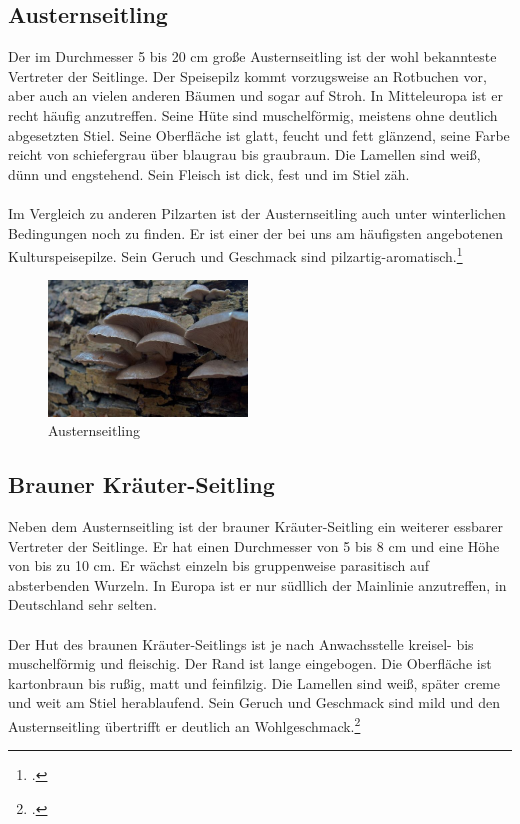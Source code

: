 \documentclass[a4paper,abstracton]{scrreprt}
\begin{document}
\subsection{Austernseitling}
Der im Durchmesser 5 bis 20 cm große Austernseitling ist der wohl bekannteste Vertreter der Seitlinge. Der Speisepilz kommt vorzugsweise an Rotbuchen vor, aber auch an vielen anderen Bäumen und sogar auf Stroh. In Mitteleuropa ist er recht häufig anzutreffen. Seine Hüte sind muschelförmig, meistens ohne deutlich abgesetzten Stiel. Seine Oberfläche ist glatt, feucht und fett glänzend, seine Farbe reicht von schiefergrau über blaugrau bis graubraun. Die Lamellen sind weiß, dünn und engstehend. Sein Fleisch ist dick, fest und im Stiel zäh.\\
\\Im Vergleich zu anderen Pilzarten ist der Austernseitling auch unter winterlichen Bedingungen noch zu finden. Er ist einer der bei uns am häufigsten angebotenen Kulturspeisepilze. Sein Geruch und Geschmack sind pilzartig-aromatisch.\footcite{tintling_auster}

\begin{figure}[H]
\centering
\includegraphics[width=200px]{auster3}
\caption[Austernseitling]{Austernseitling\protect\footnotemark}
\label{fig:austernseitling}
\end{figure}

\subsection{Brauner Kräuter-Seitling}
Neben dem Austernseitling ist der brauner Kräuter-Seitling ein weiterer essbarer Vertreter der Seitlinge. Er hat einen Durchmesser von 5 bis 8 cm und eine Höhe von bis zu 10 cm. Er wächst einzeln bis gruppenweise parasitisch auf absterbenden Wurzeln. In Europa ist er nur südllich der Mainlinie anzutreffen, in Deutschland sehr selten.\\
\\Der Hut des braunen Kräuter-Seitlings ist je nach Anwachsstelle kreisel- bis muschelförmig und fleischig. Der Rand ist lange eingebogen. Die Oberfläche ist kartonbraun bis rußig, matt und feinfilzig. Die Lamellen sind weiß, später creme und weit am Stiel herablaufend. Sein Geruch und Geschmack sind mild und den Austernseitling übertrifft er deutlich an Wohlgeschmack.\footcite{tintling_kraeuter}
\end{document}
